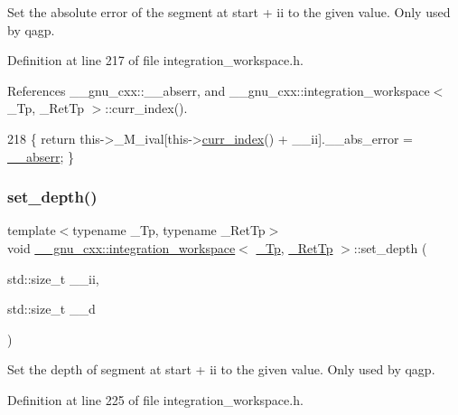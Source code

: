Set the absolute error of the segment at start + ii to the given value. Only used by qagp. 

Definition at line 217 of file integration\+\_\+workspace.\+h.



References \+\_\+\+\_\+gnu\+\_\+cxx\+::\+\_\+\+\_\+abserr, and \+\_\+\+\_\+gnu\+\_\+cxx\+::integration\+\_\+workspace$<$ \+\_\+\+Tp, \+\_\+\+Ret\+Tp $>$\+::curr\+\_\+index().


\begin{DoxyCode}
218       \{ \textcolor{keywordflow}{return} this->\_M\_ival[this->\hyperlink{class____gnu__cxx_1_1integration__workspace_a51a384b1777615943add69f1895454f5}{curr\_index}() + \_\_ii].\_\_abs\_error = 
      \hyperlink{namespace____gnu__cxx_a72f736cff127f1574e91a301de9e074b}{\_\_abserr}; \}
\end{DoxyCode}
\mbox{\label{class____gnu__cxx_1_1integration__workspace_a16ba1aa9ba732eefd080784a305b1b82}} 
\subsubsection{\texorpdfstring{set\+\_\+depth()}{set\_depth()}}
{\footnotesize\ttfamily template$<$typename \+\_\+\+Tp, typename \+\_\+\+Ret\+Tp$>$ \\
void \hyperlink{class____gnu__cxx_1_1integration__workspace}{\+\_\+\+\_\+gnu\+\_\+cxx\+::integration\+\_\+workspace}$<$ \hyperlink{namespace____gnu__cxx_a3b19a9c800ca194374ef9172290f7d79}{\+\_\+\+Tp}, \hyperlink{namespace____gnu__cxx_a886e03ece3d53ff7fa6c098a40f93fa5}{\+\_\+\+Ret\+Tp} $>$\+::set\+\_\+depth (\begin{DoxyParamCaption}\item[{std\+::size\+\_\+t}]{\+\_\+\+\_\+ii,  }\item[{std\+::size\+\_\+t}]{\+\_\+\+\_\+d }\end{DoxyParamCaption})\hspace{0.3cm}{\ttfamily [inline]}}

Set the depth of segment at start + ii to the given value. Only used by qagp. 

Definition at line 225 of file integration\+\_\+workspace.\+h.



